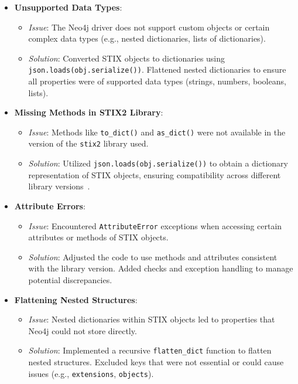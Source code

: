 \documentclass[conference]{IEEEtran}
\begin{document}
\begin{itemize}
    \item \textbf{Unsupported Data Types}:
    \begin{itemize}
        \item \textit{Issue}: The Neo4j driver does not support custom objects or certain complex data types (e.g., nested dictionaries, lists of dictionaries).
        \item \textit{Solution}: Converted STIX objects to dictionaries using \texttt{json.loads(obj.serialize())}. Flattened nested dictionaries to ensure all properties were of supported data types (strings, numbers, booleans, lists).
    \end{itemize}
    
    \item \textbf{Missing Methods in STIX2 Library}:
    \begin{itemize}
        \item \textit{Issue}: Methods like \texttt{to\_dict()} and \texttt{as\_dict()} were not available in the version of the \texttt{stix2} library used.
        \item \textit{Solution}: Utilized \texttt{json.loads(obj.serialize())} to obtain a dictionary representation of STIX objects, ensuring compatibility across different library versions~\cite{stix2python}.
    \end{itemize}
    
    \item \textbf{Attribute Errors}:
    \begin{itemize}
        \item \textit{Issue}: Encountered \texttt{AttributeError} exceptions when accessing certain attributes or methods of STIX objects.
        \item \textit{Solution}: Adjusted the code to use methods and attributes consistent with the library version. Added checks and exception handling to manage potential discrepancies.
    \end{itemize}
    
    \item \textbf{Flattening Nested Structures}:
    \begin{itemize}
        \item \textit{Issue}: Nested dictionaries within STIX objects led to properties that Neo4j could not store directly.
        \item \textit{Solution}: Implemented a recursive \texttt{flatten\_dict} function to flatten nested structures. Excluded keys that were not essential or could cause issues (e.g., \texttt{extensions}, \texttt{objects}).
    \end{itemize}
\end{itemize}
\end{document}
